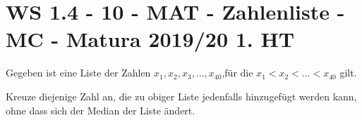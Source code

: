 \section{WS 1.4 - 10 - MAT - Zahlenliste - MC - Matura 2019/20 1. HT}

\begin{beispiel}[WS 1.4]{1}
Gegeben ist eine Liste der Zahlen $x_1, x_2, x_3, \ldots, x_{40}$,für die $x_1<x_2<\ldots<x_{40}$ gilt.

Kreuze diejenige Zahl an, die zu obiger Liste jedenfalls hinzugefügt werden kann, ohne dass sich der Median der Liste ändert.

\end{beispiel}